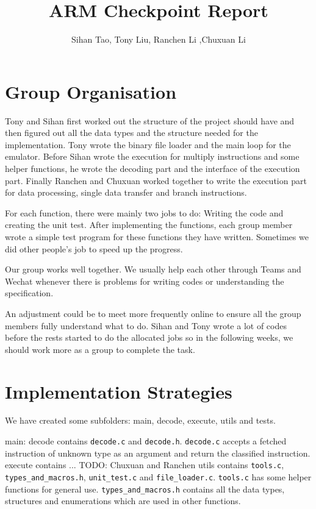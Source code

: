 \documentclass[11pt]{article}
\begin{document}
\title{ARM Checkpoint Report}
\author{Sihan Tao, Tony Liu, Ranchen Li ,Chuxuan Li}

\maketitle

\section{Group Organisation}

Tony and Sihan first worked out the structure of the project should have and then figured out all the data types and the structure needed for the implementation. Tony wrote the binary file loader and the main loop for the emulator. Before Sihan wrote the execution for multiply instructions and some helper functions, he wrote the decoding part and the interface of the execution part. Finally Ranchen and Chuxuan worked together to write the execution part for data processing, single data transfer and branch instructions.

For each function, there were mainly two jobs to do: Writing the code and creating the unit test. After implementing the functions, each group member wrote a simple test program for these functions they have written. Sometimes we did other people's job to speed up the progress. 

Our group works well together. We usually help each other through Teams and Wechat whenever there is problems for writing codes or understanding the specification. 

An adjustment could be to meet more frequently online to ensure all the group members fully understand what to do. Sihan and Tony wrote a lot of codes before the rests started to do the allocated jobs so in the following weeks, we should work more as a group to complete the task.

\section{Implementation Strategies}

We have created some subfolders: main, decode, execute, utils and tests. 

main: 
decode contains \texttt{decode.c} and \texttt{decode.h}. \texttt{decode.c} accepts a fetched instruction of unknown type as an argument and return the classified instruction.
execute contains ... TODO: Chuxuan and Ranchen
utils contains \texttt{tools.c}, \texttt{types\_and\_macros.h}, \texttt{unit\_test.c} and \texttt{file\_loader.c}.
\texttt{tools.c} has some helper functions for general use.
\texttt{types\_and\_macros.h} contains all the data types, structures and enumerations which are used in other functions. 
\end{document}

